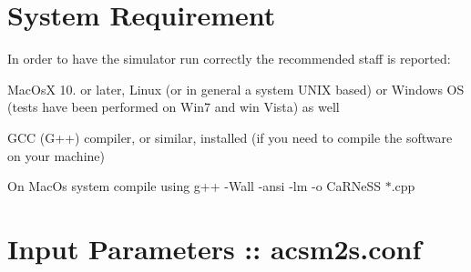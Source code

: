 \par
\par
 \hypertarget{intro_sysreq}{}\section{System Requirement}\label{intro_sysreq}


 In order to have the simulator run correctly the recommended staff is reported\-:
\begin{DoxyItemize}
\item Mac\-Os\-X 10. or later, Linux (or in general a system U\-N\-I\-X based) or Windows O\-S (tests have been performed on Win7 and win Vista) as well
\item G\-C\-C (G++) compiler, or similar, installed (if you need to compile the software on your machine)
\end{DoxyItemize}

On Mac\-Os system compile using {\ttfamily g++} -\/\-Wall -\/ansi -\/lm -\/o Ca\-R\-Ne\-S\-S $\ast$.cpp \par
\par
 \hypertarget{intro_parameters}{}\section{Input Parameters \-:: acsm2s.\-conf}\label{intro_parameters}


